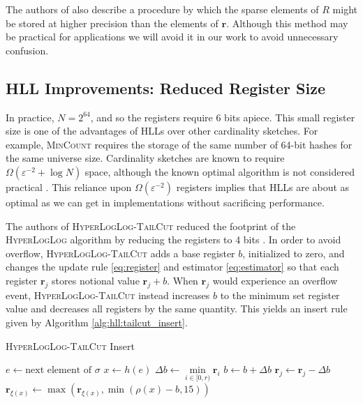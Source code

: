 \documentclass{report}
\newcommand{\algoname}[1]{\textnormal{\textsc{#1}}}
\begin{document}
The authors of \cite{heule2013hyperloglog} also describe a procedure by which the sparse elements of $R$ might be stored at higher precision than the elements of $\mathbf{r}$.
Although this method may be practical for applications we will avoid it in our work to avoid unnecessary confusion.







\subsection{\algoname{HLL} Improvements: Reduced Register Size}
 \label{DS:sec:HLL:reduced}

In practice, $N= 2^{64}$, and so the registers require 6 bits apiece.
This small register size is one of the advantages of \algoname{HLL}s over other cardinality sketches.
For example, \algoname{MinCount} requires the storage of the same number of 64-bit hashes for the same universe size. 
Cardinality sketches are known to require $\Omega(\varepsilon^{-2} + \log N)$ space, although the known optimal algorithm is not considered practical \cite{kane2010optimal}.
This reliance upon $\Omega(\varepsilon^{-2})$ registers implies that \algoname{HLL}s are about as optimal as we can get in implementations without sacrificing performance.

The authors of \algoname{HyperLogLog-TailCut} reduced the footprint of the \algoname{HyperLogLog} algorithm by reducing the registers to 4 bits \cite{xiao2017better}.
In order to avoid overflow, \algoname{HyperLogLog-TailCut} adds a base register $b$, initialized to zero, and changes the update rule \eqref{eq:register} and estimator \eqref{eq:estimator} so that each register $\mathbf{r}_j$ stores notional value $\mathbf{r}_j + b$. 
When $\mathbf{r}_j$ would experience an overflow event, \algoname{HyperLogLog-TailCut} instead increases $b$ to the minimum set register value and decreases all registers by the same quantity. 
This yields an insert rule given by Algorithm \ref{alg:hll:tailcut_insert}.
\begin{algorithm}
\caption{\algoname{HyperLogLog-TailCut} Insert}\label{alg:hll:tailcut_insert}
\begin{algorithmic}[1]
	\State $e \gets \text{next element of $\sigma$}$
	\State $x \gets h(e)$
		\State $\Delta b \gets \min\limits_{i \in [0, r)} \mathbf{r}_i$
			\State $b \gets b + \Delta b$
			\For {$j \in [0,r)$}
				\State $\mathbf{r}_j \gets \mathbf{r}_j - \Delta b$
			\EndFor
		\EndIf
	\EndIf
	\State $\mathbf{r}_{\xi(x)} \gets \max ( \mathbf{r}_{\xi(x)}, \min ( \rho(x) - b, 15))$
\end{algorithmic}
\end{algorithm}
\end{document}
